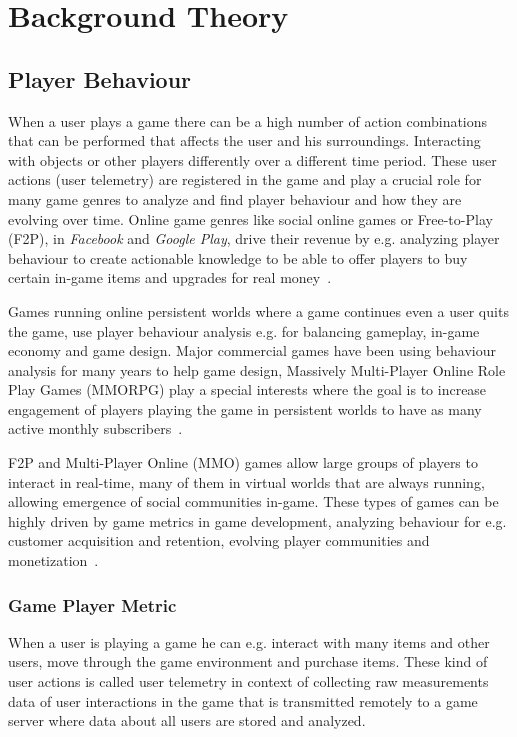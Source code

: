 
\chapter{Background Theory} %
\label{Chapter2}


\section{Player Behaviour}
When a user plays a game there can be a high number of action combinations that can be performed that affects the user and his surroundings. Interacting with objects or other players differently over a different time period. These user actions (user telemetry) are registered in the game and play a crucial role for many game genres to analyze and find player behaviour and how they are evolving over time. Online game genres like social online games or Free-to-Play (F2P), in \textit{Facebook} and \textit{Google Play}, drive their revenue by e.g. analyzing player behaviour to create actionable knowledge to be able to offer players to buy certain in-game items and upgrades for real money~\citep{Kim:2008Tracking, Drachen:2011Evaluating, Fields:2011SocialGame, Seif:2013GameAnalytics}.

Games running online persistent worlds where a game continues even a user quits the game, use player behaviour analysis e.g. for balancing gameplay, in-game economy and game design. Major commercial games have been using behaviour analysis for many years to help game design, Massively Multi-Player Online Role Play Games (MMORPG) play a special interests where the goal is to increase engagement of players playing the game in persistent worlds to have as many active monthly subscribers~\citep{Zoeller:2010, Yannakakis:2012}. 

F2P and Multi-Player Online (MMO) games allow large groups of players to interact in real-time, many of them in virtual worlds that are always running, allowing emergence of social communities in-game. These types of games can be highly driven by game metrics in game development, analyzing behaviour for e.g. customer acquisition and retention, evolving player communities and monetization~\citep{Drachen:2013GDM}.

\subsection{Game Player Metric}
When a user is playing a game he can e.g. interact with many items and other users, move through the game environment and purchase items. These kind of user actions is called user telemetry in context of collecting raw measurements data of user interactions in the game that is transmitted remotely to a game server where data about all users are stored and analyzed. 

